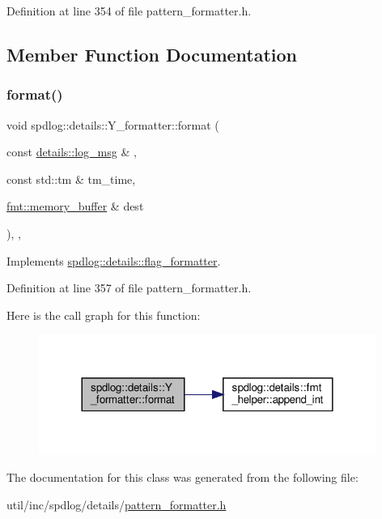 Definition at line 354 of file pattern\+\_\+formatter.\+h.



\subsection{Member Function Documentation}
\mbox{\label{classspdlog_1_1details_1_1_y__formatter_a0a05d2970b7558f0e24336fdc05e504a}} 
\subsubsection{\texorpdfstring{format()}{format()}}
{\footnotesize\ttfamily void spdlog\+::details\+::\+Y\+\_\+formatter\+::format (\begin{DoxyParamCaption}\item[{const \hyperlink{structspdlog_1_1details_1_1log__msg}{details\+::log\+\_\+msg} \&}]{,  }\item[{const std\+::tm \&}]{tm\+\_\+time,  }\item[{\hyperlink{format_8h_a21cbf729f69302f578e6db21c5e9e0d2}{fmt\+::memory\+\_\+buffer} \&}]{dest }\end{DoxyParamCaption})\hspace{0.3cm}{\ttfamily [inline]}, {\ttfamily [override]}, {\ttfamily [virtual]}}



Implements \hyperlink{classspdlog_1_1details_1_1flag__formatter_a33fb3e42a4c8200cceb833d92b53fb67}{spdlog\+::details\+::flag\+\_\+formatter}.



Definition at line 357 of file pattern\+\_\+formatter.\+h.

Here is the call graph for this function\+:
\nopagebreak
\begin{figure}[H]
\begin{center}
\leavevmode
\includegraphics[width=312pt]{classspdlog_1_1details_1_1_y__formatter_a0a05d2970b7558f0e24336fdc05e504a_cgraph}
\end{center}
\end{figure}


The documentation for this class was generated from the following file\+:\begin{DoxyCompactItemize}
\item 
util/inc/spdlog/details/\hyperlink{pattern__formatter_8h}{pattern\+\_\+formatter.\+h}\end{DoxyCompactItemize}
